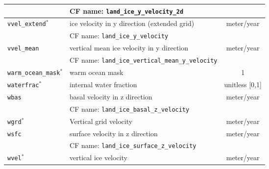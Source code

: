 \begin{center}
\begin{supertabular}{|l|p{8cm}|c|}
&CF name: \texttt{land\_ice\_y\_velocity\_2d}&\\
\hline
\texttt{vvel\_extend}$^\ast$ & ice velocity in y direction (extended grid) & meter/year\\
&CF name: \texttt{land\_ice\_y\_velocity}&\\
\hline
\texttt{vvel\_mean} & vertical mean ice velocity in y direction & meter/year\\
&CF name: \texttt{land\_ice\_vertical\_mean\_y\_velocity}&\\
\hline
\texttt{warm\_ocean\_mask}$^\ast$ & warm ocean mask & 1\\
\hline
\texttt{waterfrac}$^\ast$ & internal water fraction & unitless [0,1]\\
\hline
\texttt{wbas} & basal velocity in z direction & meter/year\\
&CF name: \texttt{land\_ice\_basal\_z\_velocity}&\\
\hline
\texttt{wgrd}$^\ast$ & Vertical grid velocity & meter/year\\
\hline
\texttt{wsfc} & surface velocity in z direction & meter/year\\
&CF name: \texttt{land\_ice\_surface\_z\_velocity}&\\
\hline
\texttt{wvel}$^\ast$ & vertical ice velocity & meter/year\\
\hline
  \end{supertabular}
\end{center}
